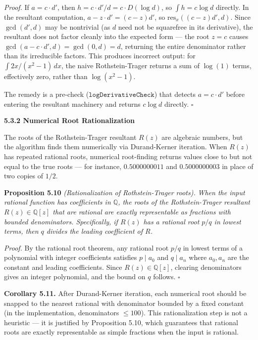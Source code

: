 \documentclass[12pt]{article}
\begin{document}
\emph{Proof.} If \(a = c \cdot d'\), then
\(h = c \cdot d'/d = c \cdot D(\log d)\), so \(\int h = c \log d\)
directly. In the resultant computation, \(a - z \cdot d' = (c - z) d'\),
so \(\mathrm{res}_x((c-z)d', d)\). Since \(\gcd(d', d)\) may be
nontrivial (as \(d\) need not be squarefree in its derivative), the
resultant does not factor cleanly into the expected form --- the root
\(z = c\) causes \(\gcd(a - c \cdot d', d) = \gcd(0, d) = d\), returning
the entire denominator rather than its irreducible factors. This
produces incorrect output: for \(\int 2x/(x^2-1)\,dx\), the naive
Rothstein-Trager returns a sum of \(\log(1)\) terms, effectively zero,
rather than \(\log(x^2-1)\).

The remedy is a pre-check (\(\mathtt{logDerivativeCheck}\)) that detects
\(a = c \cdot d'\) before entering the resultant machinery and returns
\(c \log d\) directly. \(\square\)

\textbf{5.3.2 Numerical Root Rationalization}

The roots of the Rothstein-Trager resultant \(R(z)\) are algebraic
numbers, but the algorithm finds them numerically via Durand-Kerner
iteration. When \(R(z)\) has repeated rational roots, numerical
root-finding returns values close to but not equal to the true roots ---
for instance, \(0.5000000011\) and \(0.5000000003\) in place of two
copies of \(1/2\).

\textbf{Proposition 5.10} \emph{(Rationalization of Rothstein-Trager
roots).} \emph{When the input rational function has coefficients in
\(\mathbb{Q}\), the roots of the Rothstein-Trager resultant
\(R(z) \in \mathbb{Q}[z]\) that are rational are exactly representable
as fractions with bounded denominators. Specifically, if \(R(z)\) has a
rational root \(p/q\) in lowest terms, then \(q\) divides the leading
coefficient of \(R\).}

\emph{Proof.} By the rational root theorem, any rational root \(p/q\) in
lowest terms of a polynomial with integer coefficients satisfies
\(p \mid a_0\) and \(q \mid a_n\) where \(a_0, a_n\) are the constant
and leading coefficients. Since \(R(z) \in \mathbb{Q}[z]\), clearing
denominators gives an integer polynomial, and the bound on \(q\)
follows. \(\square\)

\textbf{Corollary 5.11.} After Durand-Kerner iteration, each numerical
root should be snapped to the nearest rational with denominator bounded
by a fixed constant (in the implementation, denominators \(\leq 100\)).
This rationalization step is not a heuristic --- it is justified by
Proposition 5.10, which guarantees that rational roots are exactly
representable as simple fractions when the input is rational.
\end{document}
